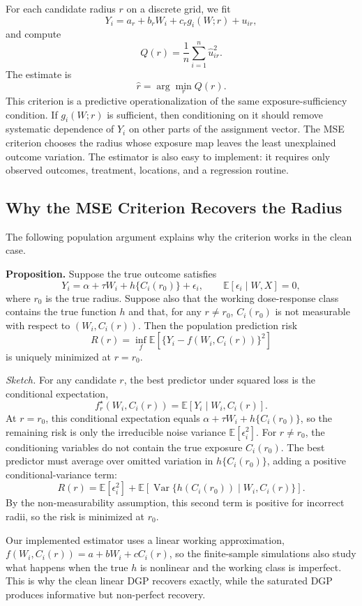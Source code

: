 \documentclass[11pt]{article}
\begin{document}
For each candidate radius $r$ on a discrete grid, we fit
\[
Y_i=a_r+b_rW_i+c_rg_i(W;r)+u_{ir},
\]
and compute
\[
Q(r)=\frac{1}{n}\sum_{i=1}^n \hat u_{ir}^2.
\]
The estimate is
\[
\hat r=\arg\min_r Q(r).
\]
This criterion is a predictive operationalization of the same exposure-sufficiency condition. If $g_i(W;r)$ is sufficient, then conditioning on it should remove systematic dependence of $Y_i$ on other parts of the assignment vector. The MSE criterion chooses the radius whose exposure map leaves the least unexplained outcome variation. The estimator is also easy to implement: it requires only observed outcomes, treatment, locations, and a regression routine.

\subsection{Why the MSE Criterion Recovers the Radius}

The following population argument explains why the criterion works in the clean case.

\textbf{Proposition.} Suppose the true outcome satisfies
\[
Y_i=\alpha+\tau W_i+h\{C_i(r_0)\}+\epsilon_i,
\qquad
\mathbb{E}[\epsilon_i\mid W, X]=0,
\]
where $r_0$ is the true radius. Suppose also that the working dose-response class contains the true function $h$ and that, for any $r\ne r_0$, $C_i(r_0)$ is not measurable with respect to $(W_i,C_i(r))$. Then the population prediction risk
\[
R(r)=\inf_f \mathbb{E}\left[\{Y_i-f(W_i,C_i(r))\}^2\right]
\]
is uniquely minimized at $r=r_0$.

\textit{Sketch.} For any candidate $r$, the best predictor under squared loss is the conditional expectation,
\[
f_r^\star(W_i,C_i(r))=\mathbb{E}[Y_i\mid W_i,C_i(r)].
\]
At $r=r_0$, this conditional expectation equals $\alpha+\tau W_i+h\{C_i(r_0)\}$, so the remaining risk is only the irreducible noise variance $\mathbb{E}[\epsilon_i^2]$. For $r\ne r_0$, the conditioning variables do not contain the true exposure $C_i(r_0)$. The best predictor must average over omitted variation in $h\{C_i(r_0)\}$, adding a positive conditional-variance term:
\[
R(r)=\mathbb{E}[\epsilon_i^2]+\mathbb{E}\!\left[\operatorname{Var}\{h(C_i(r_0))\mid W_i,C_i(r)\}\right].
\]
By the non-measurability assumption, this second term is positive for incorrect radii, so the risk is minimized at $r_0$.

Our implemented estimator uses a linear working approximation, $f(W_i,C_i(r))=a+bW_i+cC_i(r)$, so the finite-sample simulations also study what happens when the true $h$ is nonlinear and the working class is imperfect. This is why the clean linear DGP recovers exactly, while the saturated DGP produces informative but non-perfect recovery.
\end{document}
